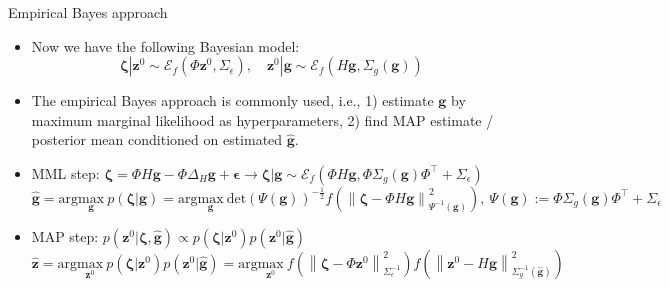 \documentclass[smaller,aspectratio=169]{beamer}        %
\newcommand{\norm}[1]{\left\lVert#1\right\rVert}
\newcommand{\dett}[1]{\mathrm{det}\left(#1\right)}
\newcommand{\ellip}[1]{\mathcal{E}_f\left(#1\right)}
\begin{document}
\begin{frame}{Empirical Bayes approach}
    \begin{itemize}
        \item Now we have the following Bayesian model:
        \[\boldsymbol{\zeta}|\mathbf{z}^0\sim\ellip{\Phi\mathbf{z}^0,\Sigma_\epsilon},\quad \mathbf{z}^0|\mathbf{g}\sim\ellip{H\mathbf{g},\Sigma_g(\mathbf{g})}\]
        \item The empirical Bayes approach is commonly used, i.e., 1) estimate $\mathbf{g}$ by maximum marginal likelihood as hyperparameters, 2) find MAP estimate / posterior mean conditioned on estimated $\hat{\mathbf{g}}$.
        \item MML step: $\boldsymbol{\zeta} = \Phi H\mathbf{g} - \Phi\Delta_H\mathbf{g} + \boldsymbol{\epsilon}\rightarrow\boldsymbol{\zeta}|\mathbf{g}\sim\ellip{\Phi H\mathbf{g},\Phi\Sigma_g(\mathbf{g})\Phi^\top+\Sigma_\epsilon}$
        \[\hat{\mathbf{g}}=\mathrm{arg}\underset{\mathbf{g}}{\mathrm{max}}\ p\left(\boldsymbol{\zeta}|\mathbf{g}\right)=\mathrm{arg}\underset{\mathbf{g}}{\mathrm{max}}\ \dett{\Psi(\mathbf{g})}^{-\frac{1}{2}}f\left(\norm{\boldsymbol{\zeta}-\Phi H\mathbf{g}}_{\Psi^{-1}(\mathbf{g})}^2\right),\ \Psi(\mathbf{g}):=\Phi\Sigma_g(\mathbf{g})\Phi^\top+\Sigma_\epsilon\]
        \item MAP step: $p\left(\mathbf{z}^0|\boldsymbol{\zeta},\hat{\mathbf{g}}\right)\propto p\left(\boldsymbol{\zeta}|\mathbf{z}^0\right)p\left(\mathbf{z}^0|\hat{\mathbf{g}}\right)$
        \[\hat{\mathbf{z}}=\mathrm{arg}\underset{\mathbf{z}^0}{\mathrm{max}}\ p\left(\boldsymbol{\zeta}|\mathbf{z}^0\right)p\left(\mathbf{z}^0|\hat{\mathbf{g}}\right)=\mathrm{arg}\underset{\mathbf{z}^0}{\mathrm{max}}\ f\left(\norm{\boldsymbol{\zeta}-\Phi\mathbf{z}^0}_{\Sigma_\epsilon^{-1}}^2\right)f\left(\norm{\mathbf{z}^0-H\hat{\mathbf{g}}}_{\Sigma_g^{-1}(\hat{\mathbf{g}})}^2\right)\]
    \end{itemize}
\end{frame}
\end{document}
